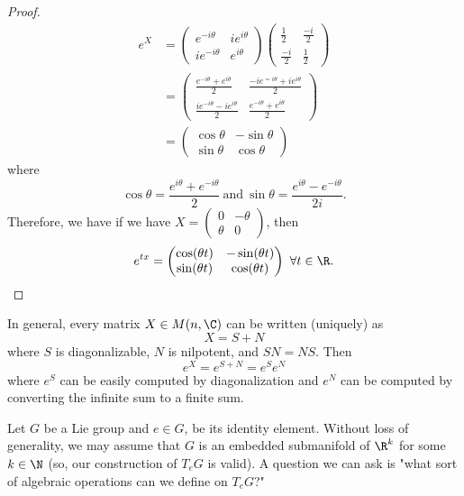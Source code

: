 \begin{proof}
\begin{align*}
    e^{X} &= \begin{pmatrix} e^{-i \theta} & i e^{i \theta} \\ i e^{-i \theta} & e^{i \theta} \end{pmatrix}  \begin{pmatrix}  \frac{ 1 }{ 2 }  & \frac{ -i  }{ 2 }  \\ \frac{ -i  }{ 2 } & \frac{ 1 }{ 2 }  \end{pmatrix} \\
          &= \begin{pmatrix}  \frac{ e^{- i \theta} + e^{i \theta} }{  2  }  & \frac{ -i e^{=i \theta} + i e^{i \theta} }{ 2 } \\ \frac{ i e^{-i \theta} - i e^{i \theta} }{ 2  } & \frac{ e^{-i \theta} + e^{i \theta} }{ 2  }   \end{pmatrix}  \\
          &= \begin{pmatrix} \cos \theta & - \sin \theta \\ \sin \theta & \cos \theta \end{pmatrix}
\end{align*}
where 
\[ \cos \theta = \frac{ e^{i \theta} + e^{- i \theta}  }{  2  }  \ \text{and} \ \sin \theta =  \frac{ e^{i \theta} - e^{-i \theta} }{ 2 i }. \]
Therefore, we have if we have \( X = \begin{pmatrix}  0 & - \theta \\ \theta & 0  \end{pmatrix}  \), then
\[  e^{tx} = \begin{pmatrix} \cos (\theta t) & - \sin (\theta t) \\ \sin (\theta t) & \cos (\theta t) \end{pmatrix}  \ \forall t \in \R.  \]

\end{proof} 

\begin{remark}
    In general, every matrix \( X \in M(n,\C) \) can be written (uniquely) as
    \[  X = S  +N  \]
    where \( S  \) is diagonalizable, \( N  \) is nilpotent, and \( SN = NS  \). Then 
    \[  e^{X} = e^{S+N} = e^{S} e^{N} \]
    where \( e^{S} \) can be easily computed by diagonalization and \( e^{N} \) can be computed by converting the infinite sum to a finite sum.
\end{remark}
\begin{remark}
    Let \( G  \) be a Lie group and \( e \in G  \), be its identity element. Without loss of generality, we may assume that \( G  \) is an embedded submanifold of \( \R^{k} \) for some \( k \in \N \) (so, our construction of \( {T}_{e}G \) is valid). A question we can ask is "what sort of algebraic operations can we define on \( {T}_{e}G \)?"
\end{remark}
 
